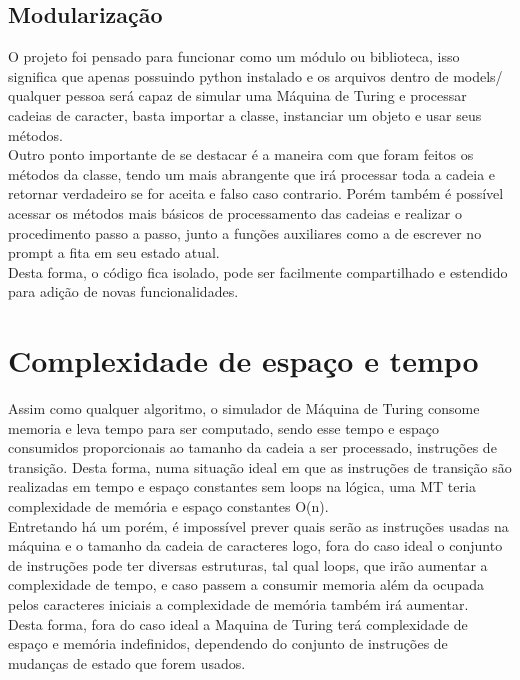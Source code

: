 \documentclass[a4paper, 12pt]{article}
\begin{document}
\subsection{Modularização}
O projeto foi pensado para funcionar como um módulo ou biblioteca, isso significa que apenas possuindo python instalado e os arquivos dentro de models/ qualquer pessoa será capaz de simular uma Máquina de Turing e processar cadeias de caracter, basta importar a classe, instanciar um objeto e usar seus métodos.\\
Outro ponto importante de se destacar é a maneira com que foram feitos os métodos da classe, tendo um mais abrangente que irá processar toda a cadeia e retornar verdadeiro se for aceita e falso caso contrario. Porém também é possível acessar os métodos mais básicos de processamento das cadeias e realizar o procedimento passo a passo, junto a funções auxiliares como a de escrever no prompt a fita em seu estado atual.\\
Desta forma, o código fica isolado, pode ser facilmente compartilhado e estendido para adição de novas funcionalidades.\\

\section{Complexidade de espaço e tempo}
Assim como qualquer algoritmo, o simulador de Máquina de Turing consome memoria e leva tempo para ser computado, sendo esse tempo e espaço consumidos proporcionais ao tamanho da cadeia a ser processado, instruções de transição. Desta forma, numa situação ideal em que as instruções de transição são realizadas em tempo e espaço constantes sem loops na lógica, uma MT teria complexidade de memória e espaço constantes O(n).\\
Entretando há um porém, é impossível prever quais serão as instruções usadas na máquina e o tamanho da cadeia de caracteres logo, fora do caso ideal o conjunto de instruções pode ter diversas estruturas, tal qual loops, que irão aumentar a complexidade de tempo, e caso passem a consumir memoria além da ocupada pelos caracteres iniciais a complexidade de memória também irá aumentar.\\
Desta forma, fora do caso ideal a Maquina de Turing terá complexidade de espaço e memória indefinidos, dependendo do conjunto de instruções de mudanças de estado que forem usados.\\
\end{document}
